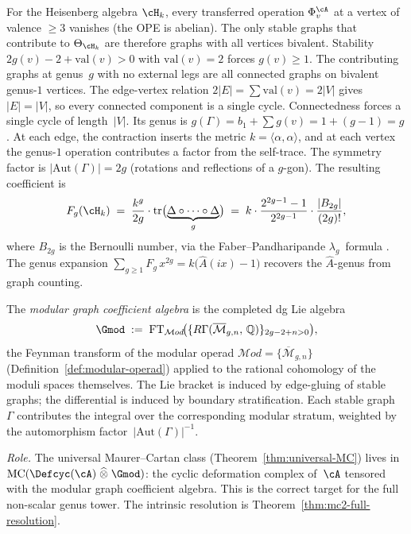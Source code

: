 \begin{example}
\label{ex:heisenberg-genus-from-graphs}
For the Heisenberg algebra $\cH_k$, every transferred operation
$\Phi_v^\cA$ at a vertex of valence $\ge 3$ vanishes (the OPE is
abelian). The only stable graphs that contribute to
$\Theta_{\cH_k}$ are therefore graphs with all vertices bivalent.
Stability $2g(v) - 2 + \mathrm{val}(v) > 0$ with
$\mathrm{val}(v) = 2$ forces $g(v) \ge 1$. The contributing
graphs at genus~$g$ with no external legs are all connected
graphs on bivalent genus-$1$ vertices. The edge-vertex relation
$2|E| = \sum \mathrm{val}(v) = 2|V|$ gives $|E| = |V|$, so
every connected component is a single cycle. Connectedness
forces a single cycle of length~$|V|$. Its genus is $g(\Gamma) = b_1 + \sum g(v) = 1 +
(g-1) = g$. At each edge, the contraction inserts the metric
$k = \langle\alpha,\alpha\rangle$, and at each vertex the
genus-$1$ operation contributes a factor from the self-trace.
The symmetry factor is $|\mathrm{Aut}(\Gamma)| = 2g$ (rotations
and reflections of a $g$-gon). The resulting coefficient is
\[
F_g(\cH_k)
\;=\;
\frac{k^g}{2g}\cdot
\operatorname{tr}\bigl(\underbrace{\Delta \circ \cdots
\circ \Delta}_{g}\bigr)
\;=\;
k\cdot\frac{2^{2g-1}-1}{2^{2g-1}}\cdot\frac{|B_{2g}|}{(2g)!},
\]
where $B_{2g}$ is the Bernoulli number, via the
Faber--Pandharipande $\lambda_g$~formula
\cite{FP03}. The genus expansion
$\sum_{g \ge 1} F_g\,x^{2g} = k\bigl(\hat{A}(ix) -
1\bigr)$ recovers the $\hat{A}$-genus from graph counting.
\end{example}

\begin{definition}
\label{def:modular-graph-algebra}
The \emph{modular graph coefficient algebra} is the completed dg Lie
algebra
\begin{equation}\label{eq:gmod-def}
\Gmod
\;:=\;
\mathrm{FT}_{\mathcal{M}od}\!\bigl(
 \{R\Gamma(\overline{\mathcal{M}}_{g,n},\, \mathbb{Q})\}_{2g-2+n>0}
\bigr),
\end{equation}
the Feynman transform of the modular operad
$\mathcal{M}od = \{\overline{\mathcal{M}}_{g,n}\}$
(Definition~\ref{def:modular-operad}) applied to the rational
cohomology of the moduli spaces themselves. The Lie bracket is
induced by edge-gluing of stable graphs; the differential is induced
by boundary stratification. Each stable graph~$\Gamma$ contributes
the integral over the corresponding modular stratum, weighted by the
automorphism factor~$|\mathrm{Aut}(\Gamma)|^{-1}$.

\smallskip\noindent
\emph{Role.}
The universal Maurer--Cartan class
(Theorem~\ref{thm:universal-MC}) lives in
$\operatorname{MC}(\Defcyc(\cA) \;\widehat{\otimes}\; \Gmod)$:
the cyclic deformation complex of~$\cA$ tensored with the modular
graph coefficient algebra. This is the correct target for the
full non-scalar genus tower.
The intrinsic resolution is Theorem~\ref{thm:mc2-full-resolution}.
\end{definition}

